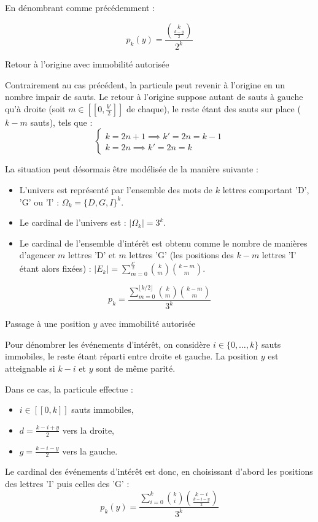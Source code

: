 \documentclass[10pt,a4paper]{article}
\begin{document}
En dénombrant comme précédemment :

\[
\boxed{p_k(y) = \dfrac{\binom{k}{\frac{k - y}{2}}}{2^k}}
\]

\q Retour à l'origine avec immobilité autorisée

Contrairement au cas précédent, la particule peut revenir à l'origine en un nombre impair de sauts.
Le retour à l'origine suppose autant de sauts à gauche qu'à droite (soit \( m \in [[ 0,
\frac{k'}{2} ]] \) de chaque), le reste étant des sauts sur place (\( k - m \) sauts), tels que :
\[
\begin{cases}
k = 2n +1 \implies k' = 2n = k - 1\\
k = 2n \implies k' = 2n = k
\end{cases}
\]

La situation peut désormais être modélisée de la manière suivante :
\begin{itemize}
 \item L'univers est représenté par l'ensemble des mots de $k$ lettres comportant 'D', 'G' ou 'I' : $\Omega_k = \lbrace D, G, I \rbrace^k$.
 \item Le cardinal de l'univers est : $|\Omega_k| = 3^k$.
 \item Le cardinal de l'ensemble d'intérêt est obtenu comme le nombre de manières d'agencer $m$
 lettres 'D' et $m$ lettres 'G' (les positions des $k - m$ lettres 'I' étant alors fixées) : $|E_k|
 = \sum_{m=0}^{\frac{k'}{2}}\binom{k}{m}\binom{k-m}{m}$.
\end{itemize}

\[
\boxed{p_k = \dfrac{ \sum_{m=0}^{\lfloor k/2 \rfloor} \binom{k}{m} \binom{k - m}{m}}{3^k}}
\]

\q Passage à une position \( y \) avec immobilité autorisée

Pour dénombrer les événements d'intérêt, on considère \( i \in \{0, \dots, k\} \) sauts immobiles,
le reste étant réparti entre droite et gauche. La position \( y \) est atteignable si \( k - i \) et
\( y \) sont de même parité.

Dans ce cas, la particule effectue :
\begin{itemize}
 \item $i \in [[ 0, k ]]$ sauts immobiles,
 \item $d = \frac{k-i+y}{2}$ vers la droite,
 \item $g = \frac{k-i-y}{2}$ vers la gauche.
\end{itemize}

Le cardinal des événements d'intérêt est donc, en choisissant d'abord les positions des lettres 'I'
puis celles des 'G' :
\[
\boxed{p_k(y) = \dfrac{\displaystyle \sum_{i = 0}^{k} \binom{k}{i} \binom{k - i}{\frac{k - i - y}{2}}}{3^k}}
\]
\end{document}

